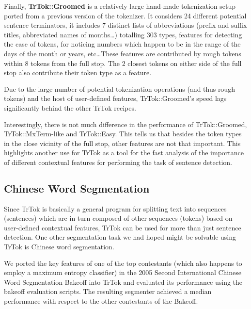 Finally, \textbf{TrTok::Groomed} is a relatively large hand-made
tokenization setup ported from a previous version of the tokenizer. It
considers 24 different potential sentence terminators, it includes 7
distinct lists of abbreviations (prefix and suffix titles, abbreviated
names of months\ldots) totalling 303 types, features for detecting the
case of tokens, for noticing numbers which happen to be in the range
of the days of the month or years, etc\ldots These features are
contributed by rough tokens within 8 tokens from the full stop. The 2
closest tokens on either side of the full stop also contribute their
token type as a feature.

Due to the large number of potential tokenization operations (and thus
rough tokens) and the host of user-defined features, TrTok::Groomed's
speed lags significantly behind the other TrTok recipes.

Interestingly, there is not much difference in the performance of
TrTok::Groomed, TrTok::MxTerm-like and TrTok::Easy. This tells us that
besides the token types in the close vicinity of the full stop, other
features are not that important. This highlights another use for TrTok
as a tool for the fast analysis of the importance of different
contextual features for performing the task of sentence detection.

\subsection{Chinese Word Segmentation}

Since TrTok is basically a general program for splitting text into
sequences (sentences) which are in turn composed of other sequences
(tokens) based on user-defined contextual features, TrTok can be used
for more than just sentence detection. One other segmentation task we
had hoped might be solvable using TrTok is Chinese word segmentation.

We ported the key features of one of the top contestants (which also
happens to employ a maximum entropy classifier)
\cite{seg-chinese-maxent} in the 2005 Second International Chinese
Word Segmentation Bakeoff into TrTok and evaluated its performance
using the bakeoff evaluation scripts. The resulting segmenter achieved
a median performance with respect to the other contestants of the
Bakeoff.
